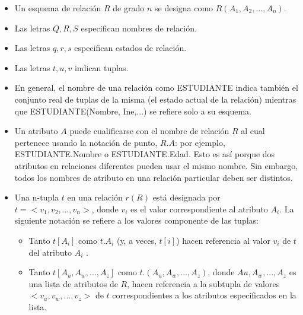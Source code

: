 \begin{itemize}
    \item Un esquema de relación $R$ de grado $n$ se designa como $R(A_1, A_2,..., A_n)$.
    \item Las letras $Q, R, S$ especifican nombres de relación.
    \item Las letras $q, r, s$ especifican estados de relación.
    \item Las letras $t, u, v$ indican tuplas.
    \item En general, el nombre de una relación como ESTUDIANTE indica también el conjunto real de tuplas de la misma (el estado actual de la relación) mientras que ESTUDIANTE(Nombre, Ine,...) se refiere solo a su esquema.
    \item Un atributo $A$ puede cualificarse con el nombre de relación $R$ al cual pertenece usando la notación de
    punto, $R.A$: por ejemplo, ESTUDIANTE.Nombre o ESTUDIANTE.Edad. Esto es así porque dos atributos en relaciones diferentes pueden usar el mismo nombre. Sin embargo, todos los nombres de atributo en una relación particular deben ser distintos.
    \item Una n-tupla $t$ en una relación $r(R)$ está designada por $t=<v_1, v_2,..., v_n>$, donde $v_i$ es el valor correspondiente al atributo $A_i$. La siguiente notación se refiere a los valores componente de las tuplas:
    \begin{itemize}
        \item Tanto $t[A_i]$ como $t.A_i$ (y, a veces, $t[i]$) hacen referencia al valor $v_i$ de $t$ del atributo $A_i$ .
        \item Tanto $t[A_u, A_w ,..., A_z]$ como $t.(A_u, A_w,..., A_z)$, donde $Au, A_w,..., A_z$ es una lista de atributos de $R$, hacen referencia a la subtupla de valores $<v_u, v_w,..., v_z>$ de $t$ correspondientes a los atributos especificados en la lista.
    \end{itemize}
    
\end{itemize}

